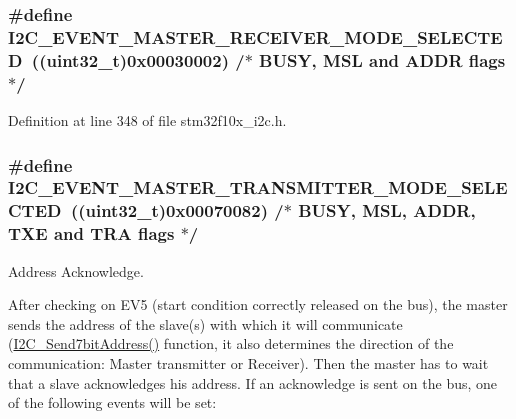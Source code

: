 \subsubsection[{\texorpdfstring{I2\+C\+\_\+\+E\+V\+E\+N\+T\+\_\+\+M\+A\+S\+T\+E\+R\+\_\+\+R\+E\+C\+E\+I\+V\+E\+R\+\_\+\+M\+O\+D\+E\+\_\+\+S\+E\+L\+E\+C\+T\+ED}{I2C_EVENT_MASTER_RECEIVER_MODE_SELECTED}}]{\setlength{\rightskip}{0pt plus 5cm}\#define I2\+C\+\_\+\+E\+V\+E\+N\+T\+\_\+\+M\+A\+S\+T\+E\+R\+\_\+\+R\+E\+C\+E\+I\+V\+E\+R\+\_\+\+M\+O\+D\+E\+\_\+\+S\+E\+L\+E\+C\+T\+ED~(({\bf uint32\+\_\+t})0x00030002)  /$\ast$ B\+U\+S\+Y, M\+S\+L and A\+D\+D\+R flags $\ast$/}\hypertarget{group___i2_c___events_gabfde82864432ddb87b6462234d542e60}{}\label{group___i2_c___events_gabfde82864432ddb87b6462234d542e60}


Definition at line 348 of file stm32f10x\+\_\+i2c.\+h.

\subsubsection[{\texorpdfstring{I2\+C\+\_\+\+E\+V\+E\+N\+T\+\_\+\+M\+A\+S\+T\+E\+R\+\_\+\+T\+R\+A\+N\+S\+M\+I\+T\+T\+E\+R\+\_\+\+M\+O\+D\+E\+\_\+\+S\+E\+L\+E\+C\+T\+ED}{I2C_EVENT_MASTER_TRANSMITTER_MODE_SELECTED}}]{\setlength{\rightskip}{0pt plus 5cm}\#define I2\+C\+\_\+\+E\+V\+E\+N\+T\+\_\+\+M\+A\+S\+T\+E\+R\+\_\+\+T\+R\+A\+N\+S\+M\+I\+T\+T\+E\+R\+\_\+\+M\+O\+D\+E\+\_\+\+S\+E\+L\+E\+C\+T\+ED~(({\bf uint32\+\_\+t})0x00070082)  /$\ast$ B\+U\+S\+Y, M\+S\+L, A\+D\+D\+R, T\+X\+E and T\+R\+A flags $\ast$/}\hypertarget{group___i2_c___events_ga2361a6e60b7dc86fb682dd06fbd3edb7}{}\label{group___i2_c___events_ga2361a6e60b7dc86fb682dd06fbd3edb7}


Address Acknowledge. 

After checking on E\+V5 (start condition correctly released on the bus), the master sends the address of the slave(s) with which it will communicate (\hyperlink{group___i2_c___private___functions_ga009fc2a5b2313c36da39ece39a1156a6}{I2\+C\+\_\+\+Send7bit\+Address()} function, it also determines the direction of the communication\+: Master transmitter or Receiver). Then the master has to wait that a slave acknowledges his address. If an acknowledge is sent on the bus, one of the following events will be set\+:

